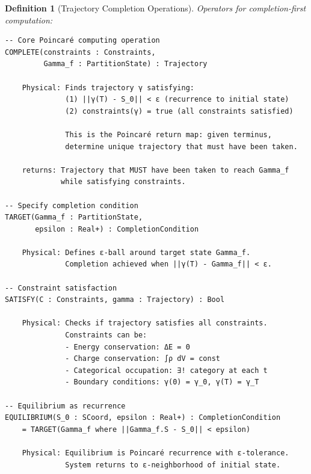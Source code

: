 \documentclass[aps,prd,twocolumn,superscriptaddress,floatfix,nofootinbib]{revtex4-2}
\newtheorem{definition}[theorem]{Definition}
\theoremstyle{remark}
\begin{document}
\begin{definition}[Trajectory Completion Operations]
\label{def:poincare_ops}
Operators for completion-first computation:
\begin{verbatim}
-- Core Poincaré computing operation
COMPLETE(constraints : Constraints,
         Gamma_f : PartitionState) : Trajectory
    
    Physical: Finds trajectory γ satisfying:
              (1) ||γ(T) - S_0|| < ε (recurrence to initial state)
              (2) constraints(γ) = true (all constraints satisfied)
              
              This is the Poincaré return map: given terminus,
              determine unique trajectory that must have been taken.
              
    returns: Trajectory that MUST have been taken to reach Gamma_f
             while satisfying constraints.

-- Specify completion condition
TARGET(Gamma_f : PartitionState,
       epsilon : Real+) : CompletionCondition
    
    Physical: Defines ε-ball around target state Gamma_f.
              Completion achieved when ||γ(T) - Gamma_f|| < ε.

-- Constraint satisfaction
SATISFY(C : Constraints, gamma : Trajectory) : Bool
    
    Physical: Checks if trajectory satisfies all constraints.
              Constraints can be:
              - Energy conservation: ΔE = 0
              - Charge conservation: ∫ρ dV = const
              - Categorical occupation: ∃! category at each t
              - Boundary conditions: γ(0) = γ_0, γ(T) = γ_T

-- Equilibrium as recurrence
EQUILIBRIUM(S_0 : SCoord, epsilon : Real+) : CompletionCondition
    = TARGET(Gamma_f where ||Gamma_f.S - S_0|| < epsilon)
    
    Physical: Equilibrium is Poincaré recurrence with ε-tolerance.
              System returns to ε-neighborhood of initial state.
\end{verbatim}
\end{definition}
\end{document}
